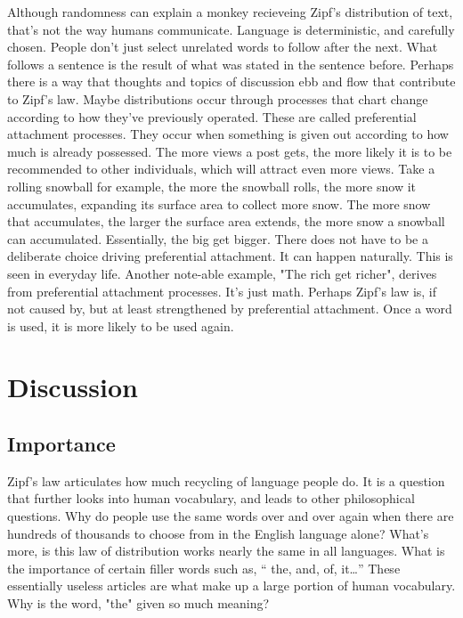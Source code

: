 \documentclass[a4paper,10pt]{article}
\begin{document}
Although randomness can explain a monkey recieveing Zipf's distribution of text, that's not the way humans communicate. Language is deterministic, and carefully chosen. People don't just select unrelated words to follow after the next. What follows a sentence is the result of what was stated in the sentence before. Perhaps there is a way that thoughts and topics of discussion ebb and flow that contribute to Zipf's law. Maybe distributions occur through processes that chart change according to how they've previously operated. These are called preferential attachment processes. They occur when something is given out according to how much is already possessed. The more views a post gets, the more likely it is to be recommended to other individuals, which will attract even more views. Take a rolling snowball for example, the more the snowball rolls, the more snow it accumulates, expanding its surface area to collect more snow. The more snow that accumulates, the larger the surface area extends, the more snow a snowball can accumulated. Essentially, the big get bigger. There does not have to be a deliberate choice driving preferential attachment. It can happen naturally. This is seen in everyday life. Another note-able example, "The rich get richer", derives from preferential attachment processes. It's just math. Perhaps Zipf's law is, if not caused by, but at least strengthened by preferential attachment. Once a word is used, it is more likely to be used again.

	

\section{Discussion}

\subsection{Importance}

Zipf’s law articulates how much recycling of language people do. It is a question that further looks into human vocabulary, and leads to other philosophical questions. Why do people use the same words over and over again when there are hundreds of thousands to choose from in the English language alone? What’s more, is this law of distribution works nearly the same in all languages. What is the importance of certain filler words such as, “ the, and, of, it…” These essentially useless articles are what make up a large portion of human vocabulary. Why is the word, "the" given so much meaning?
\end{document}
